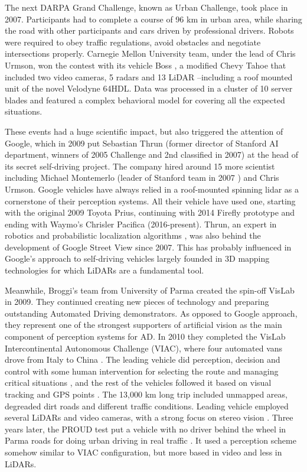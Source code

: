 The next DARPA Grand Challenge, known as Urban Challenge, took place in 2007.
Participants had to complete a course of 96 km in urban area, while sharing the
road with other participants and cars driven by professional drivers. Robots
were required to obey traffic regulations, avoid obstacles and negotiate 
intersections properly. Carnegie Mellon University team, under the lead of
Chris Urmson, won the contest with 
its vehicle Boss \cite{TartanRacing2005}, a 
modified Chevy Tahoe that included two video cameras, 
5 radars and 13 LiDAR --including a roof mounted unit of the novel Velodyne
64HDL. Data was processed in a cluster of 10 server blades and featured
a complex behavioral model \cite{Urmson2007} for covering all the expected
situations.

These events had a huge scientific impact, but also triggered the attention of
Google, which in 2009 put Sebastian Thrun (former director of Stanford AI 
department, winners of 2005 Challenge and 2nd classified in 2007) at the 
head of its secret self-driving project. 
The company hired around 15 more scientist including Michael Montemerlo 
\cite{Montemerlo2003a} (leader of Stanford team in 2007 \cite{Montemerlo2008}) 
and Chris Urmson.
Google vehicles have always relied in a roof-mounted spinning lidar as 
a cornerstone of their perception systems. All their vehicle have used one, 
starting with the original 2009 Toyota Prius, continuing with 2014 Firefly
prototype and ending with Waymo's Chrisler Pacifica (2016-present).
Thrun, an expert in robotics and probabilistic localization algorithms
\cite{Levinson2011}, 
was also behind the development of Google Street View since 2007. 
This has probably influenced in Google's approach to self-driving vehicles 
largely founded in 3D mapping technologies \cite{Chapell2016} for which LiDARs
are a fundamental tool.
 
 
Meanwhile, Broggi's team from University of Parma created the spin-off VisLab
in 2009. They continued creating new pieces of technology and preparing 
outstanding Automated Driving demonstrators. As opposed to Google approach,
they represent one of the strongest supporters of artificial vision as the main 
component of perception systems for AD. In 2010 they 
completed the VisLab Intercontinental Autonomous Challenge (VIAC), where
four automated vans drove from Italy to China \cite{Bertozzi2011}.
The leading vehicle did perception, decision and control with some human 
intervention for selecting the route and managing critical situations
\cite{Broggi2012a}, and the rest of the vehicles followed it based on visual
tracking and GPS points \cite{Broggi2012a}. 
The 13,000 km long trip included unmapped areas, degreaded dirt roads and
different traffic conditions. Leading vehicle employed several LiDARs and
video cameras, with a strong focus on stereo vision \cite{Broggi2011}.
Three years later, the PROUD test put a vehicle with no driver behind the
wheel in Parma roads for doing urban driving in real traffic 
\cite{Broggi2013}. 
It used a perception scheme somehow similar to VIAC configuration, but more 
based in video and less in LiDARs.
 
